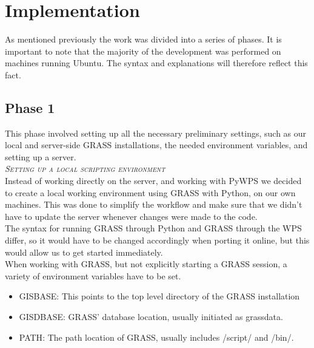 
\chapter{Implementation} %

\label{ch:theory} %


As mentioned previously the work was divided into a series of phases. It is important to note that the majority of the development was performed on machines running Ubuntu. The syntax and explanations will therefore reflect this fact.

\section{Phase 1}
This phase involved setting up all the necessary preliminary settings, such as our local and server-side GRASS installations, the needed environment variables, and setting up a server. \\

\textsc{\textit{Setting up a local scripting environment}} \\

Instead of working directly on the server, and working with PyWPS we decided to create a local working environment using GRASS with Python, on our own machines. This was done to simplify the workflow and make sure that  we didn't have to update the server whenever changes were made to the code. \\
The syntax for running GRASS through Python and GRASS through the WPS differ, so it would have to be changed accordingly when porting it online, but this would allow us to get started immediately. \\
When working with GRASS, but not explicitly starting a GRASS session, a variety of environment variables have to be set. 

\begin{itemize}
\item \textsc{GISBASE}: This points to the top level directory of the GRASS installation
\item \textsc{GISDBASE}: GRASS' database location, usually initiated as grassdata.
\item \textsc{PATH}: The path location of GRASS, usually includes /script/ and /bin/.
\end{itemize} \\


